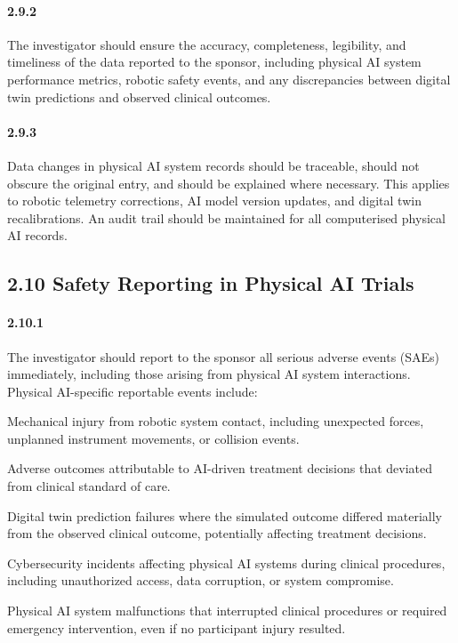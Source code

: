 \documentclass[11pt]{article}
\begin{document}
\paragraph{2.9.2} The investigator should ensure the accuracy, completeness, legibility, and timeliness of the data reported to the sponsor, including physical AI system performance metrics, robotic safety events, and any discrepancies between digital twin predictions and observed clinical outcomes.

\paragraph{2.9.3} Data changes in physical AI system records should be traceable, should not obscure the original entry, and should be explained where necessary. This applies to robotic telemetry corrections, AI model version updates, and digital twin recalibrations. An audit trail should be maintained for all computerised physical AI records.

\subsection{2.10 Safety Reporting in Physical AI Trials}

\paragraph{2.10.1} The investigator should report to the sponsor all serious adverse events (SAEs) immediately, including those arising from physical AI system interactions. Physical AI-specific reportable events include:

\begin{description}[leftmargin=2.5cm,style=sameline]

\item[(a)] Mechanical injury from robotic system contact, including unexpected forces, unplanned instrument movements, or collision events.

\item[(b)] Adverse outcomes attributable to AI-driven treatment decisions that deviated from clinical standard of care.

\item[(c)] Digital twin prediction failures where the simulated outcome differed materially from the observed clinical outcome, potentially affecting treatment decisions.

\item[(d)] Cybersecurity incidents affecting physical AI systems during clinical procedures, including unauthorized access, data corruption, or system compromise.

\item[(e)] Physical AI system malfunctions that interrupted clinical procedures or required emergency intervention, even if no participant injury resulted.

\end{description}
\end{document}
